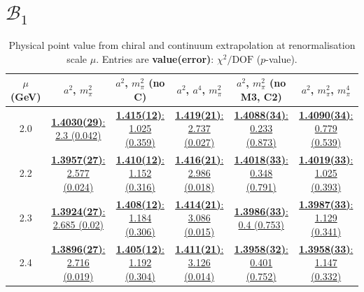 \documentclass[12pt]{extarticle}
\begin{document}
\section{$\mathcal{B}_1$}
\begin{table}[h!]
\begin{center}
\begin{tabular}{|c|c|c|c|c|c|}
\hline
$\mu$ (GeV) & $a^2$, $m_\pi^2$& $a^2$, $m_\pi^2$ (no C)& $a^2$, $a^4$, $m_\pi^2$& $a^2$, $m_\pi^2$ (no M3, C2)& $a^2$, $m_\pi^2$, $m_\pi^4$\\
\hline
2.0& \hyperlink{VVpAA/SUSY/a2m2_20.pdf.1}{\textbf{1.4030(29)}: 2.3 (0.042)} & \hyperlink{VVpAA/SUSY/a2m2noC_20.pdf.1}{\textbf{1.415(12)}: 1.025 (0.359)} & \hyperlink{VVpAA/SUSY/a2a4m2_20.pdf.1}{\textbf{1.419(21)}: 2.737 (0.027)} & \hyperlink{VVpAA/SUSY/a2m2mcut_20.pdf.1}{\textbf{1.4088(34)}: 0.233 (0.873)} & \hyperlink{VVpAA/SUSY/a2m2m4_20.pdf.1}{\textbf{1.4090(34)}: 0.779 (0.539)}\\
2.2& \hyperlink{VVpAA/SUSY/a2m2_22.pdf.1}{\textbf{1.3957(27)}: 2.577 (0.024)} & \hyperlink{VVpAA/SUSY/a2m2noC_22.pdf.1}{\textbf{1.410(12)}: 1.152 (0.316)} & \hyperlink{VVpAA/SUSY/a2a4m2_22.pdf.1}{\textbf{1.416(21)}: 2.986 (0.018)} & \hyperlink{VVpAA/SUSY/a2m2mcut_22.pdf.1}{\textbf{1.4018(33)}: 0.348 (0.791)} & \hyperlink{VVpAA/SUSY/a2m2m4_22.pdf.1}{\textbf{1.4019(33)}: 1.025 (0.393)}\\
2.3& \hyperlink{VVpAA/SUSY/a2m2_23.pdf.1}{\textbf{1.3924(27)}: 2.685 (0.02)} & \hyperlink{VVpAA/SUSY/a2m2noC_23.pdf.1}{\textbf{1.408(12)}: 1.184 (0.306)} & \hyperlink{VVpAA/SUSY/a2a4m2_23.pdf.1}{\textbf{1.414(21)}: 3.086 (0.015)} & \hyperlink{VVpAA/SUSY/a2m2mcut_23.pdf.1}{\textbf{1.3986(33)}: 0.4 (0.753)} & \hyperlink{VVpAA/SUSY/a2m2m4_23.pdf.1}{\textbf{1.3987(33)}: 1.129 (0.341)}\\
2.4& \hyperlink{VVpAA/SUSY/a2m2_24.pdf.1}{\textbf{1.3896(27)}: 2.716 (0.019)} & \hyperlink{VVpAA/SUSY/a2m2noC_24.pdf.1}{\textbf{1.405(12)}: 1.192 (0.304)} & \hyperlink{VVpAA/SUSY/a2a4m2_24.pdf.1}{\textbf{1.411(21)}: 3.126 (0.014)} & \hyperlink{VVpAA/SUSY/a2m2mcut_24.pdf.1}{\textbf{1.3958(32)}: 0.401 (0.752)} & \hyperlink{VVpAA/SUSY/a2m2m4_24.pdf.1}{\textbf{1.3958(33)}: 1.147 (0.332)}\\
\hline
\end{tabular}
\caption{Physical point value from chiral and continuum extrapolation at renormalisation scale $\mu$. Entries are \textbf{value(error)}: $\chi^2/\text{DOF}$ ($p$-value).}
\end{center}
\end{table}
\end{document}
